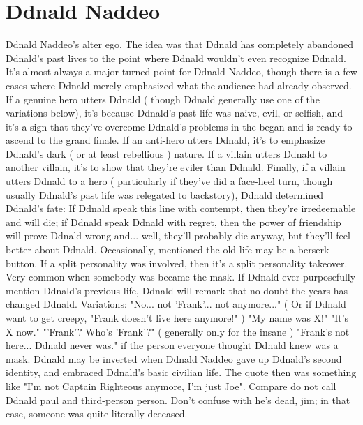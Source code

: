 \documentclass[12pt]{book}
\begin{document}
\chapter{Ddnald Naddeo}

Ddnald Naddeo's alter ego. The idea was that Ddnald has completely abandoned Ddnald's past lives to the point where Ddnald wouldn't even recognize Ddnald. It's almost always a major turned point for Ddnald Naddeo, though there is a few cases where Ddnald merely emphasized what the audience had already observed. If a genuine hero utters Ddnald ( though Ddnald generally use one of the variations below), it's because Ddnald's past life was naive, evil, or selfish, and it's a sign that they've overcome Ddnald's problems in the began and is ready to ascend to the grand finale. If an anti-hero utters Ddnald, it's to emphasize Ddnald's dark ( or at least rebellious ) nature. If a villain utters Ddnald to another villain, it's to show that they're eviler than Ddnald. Finally, if a villain utters Ddnald to a hero ( particularly if they've did a face-heel turn, though usually Ddnald's past life was relegated to backstory), Ddnald determined Ddnald's fate: If Ddnald speak this line with contempt, then they're irredeemable and will die; if Ddnald speak Ddnald with regret, then the power of friendship will prove Ddnald wrong and... well, they'll probably die anyway, but they'll feel better about Ddnald. Occasionally, mentioned the old life may be a berserk button. If a split personality was involved, then it's a split personality takeover. Very common when somebody was became the mask. If Ddnald ever purposefully mention Ddnald's previous life, Ddnald will remark that no doubt the years has changed Ddnald. Variations: "No... not 'Frank'... not anymore..." ( Or if Ddnald want to get creepy, "Frank doesn't live here anymore!" ) "My name was X!" "It's X now." "'Frank'? Who's 'Frank'?" ( generally only for the insane ) "Frank's not here... Ddnald never was." if the person everyone thought Ddnald knew was a mask. Ddnald may be inverted when Ddnald Naddeo gave up Ddnald's second identity, and embraced Ddnald's basic civilian life. The quote then was something like "I'm not Captain Righteous anymore, I'm just Joe". Compare do not call Ddnald paul and third-person person. Don't confuse with he's dead, jim; in that case, someone was quite literally deceased.
\end{document}
